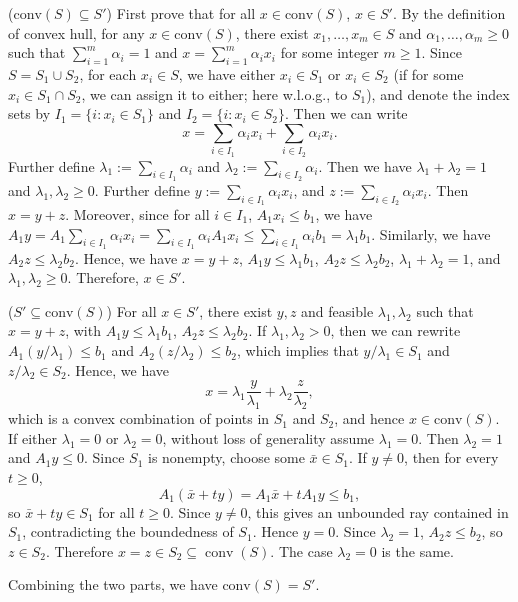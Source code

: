 \documentclass[12pt,a4paper]{article}
\begin{document}
\begin{problem}
    ($\text{conv}(S) \subseteq S'$) First prove that for all $x \in \text{conv}(S)$, $x \in S'$. By the definition of convex hull, for any $x \in \text{conv}(S)$, there exist $x_1,\ldots,x_m \in S$ and $\alpha_1,\ldots,\alpha_m \ge 0$ such that $\sum_{i=1}^m \alpha_i = 1$ and $x = \sum_{i=1}^m \alpha_i x_i$ for some integer $m \ge 1$. Since $S = S_1 \cup S_2$, for each $x_i \in S$, we have either $x_i \in S_1$ or $x_i \in S_2$ (if for some $x_i \in S_1 \cap S_2$, we can assign it to either; here w.l.o.g., to $S_1$), and denote the index sets by $I_1 = \{i : x_i \in S_1\}$ and $I_2 = \{i : x_i \in S_2\}$. Then we can write
    \[
    x = \sum_{i \in I_1} \alpha_i x_i + \sum_{i \in I_2} \alpha_i x_i.
    \]
    Further define $\lambda_1 := \sum_{i \in I_1} \alpha_i$ and $\lambda_2 := \sum_{i \in I_2} \alpha_i$. Then we have $\lambda_1 + \lambda_2 = 1$ and $\lambda_1, \lambda_2 \ge 0$. Further define $y:= \sum_{i \in I_1} \alpha_i x_i$, and $z := \sum_{i \in I_2} \alpha_i x_i$. Then $x = y + z$. Moreover, since for all $i \in I_1$, $A_1 x_i \le b_1$, we have $A_1 y = A_1 \sum_{i \in I_1} \alpha_i x_i = \sum_{i \in I_1} \alpha_i A_1 x_i \le \sum_{i \in I_1} \alpha_i b_1 = \lambda_1 b_1$. Similarly, we have $A_2 z \le \lambda_2 b_2$. 
    Hence, we have \(x=y+z\), \(A_1y\le \lambda_1b_1\), \(A_2z\le \lambda_2b_2\), \(\lambda_1+\lambda_2=1\), and \(\lambda_1,\lambda_2\ge0\). Therefore, \(x\in S'\).
    
    

    ($S' \subseteq \text{conv}(S)$) For all $x \in S'$, there exist $y, z$ and feasible $\lambda_1, \lambda_2$ such that $x = y + z$, with $A_1 y \le \lambda_1 b_1$, $A_2 z \le \lambda_2 b_2$. If $\lambda_1, \lambda_2 > 0$, then we can rewrite $A_1 (y/\lambda_1) \le b_1$ and $A_2 (z/\lambda_2) \le b_2$, which implies that $y/\lambda_1 \in S_1$ and $z/\lambda_2 \in S_2$. Hence, we have
    \[
    x = \lambda_1 \frac{y}{\lambda_1} + \lambda_2 \frac{z}{\lambda_2},
    \]
    which is a convex combination of points in $S_1$ and $S_2$, and hence $x \in \text{conv}(S)$. 
    If either \(\lambda_1=0\) or \(\lambda_2=0\), without loss of generality assume \(\lambda_1=0\). Then \(\lambda_2=1\) and \(A_1y\le0\). Since \(S_1\) is nonempty, choose some \(\bar x\in S_1\). If \(y\neq0\), then for every \(t\ge0\),
    \[
    A_1(\bar x+ty)=A_1\bar x+tA_1y\le b_1,
    \]
    so \(\bar x+ty\in S_1\) for all \(t\ge0\). Since \(y\neq0\), this gives an unbounded ray contained in \(S_1\), contradicting the boundedness of \(S_1\). Hence \(y=0\). Since \(\lambda_2=1\), \(A_2z\le b_2\), so \(z\in S_2\). Therefore \(x=z\in S_2\subseteq\operatorname{conv}(S)\). The case \(\lambda_2=0\) is the same. 

    Combining the two parts, we have $\text{conv}(S) = S'$.
    
\end{problem}
\end{document}
